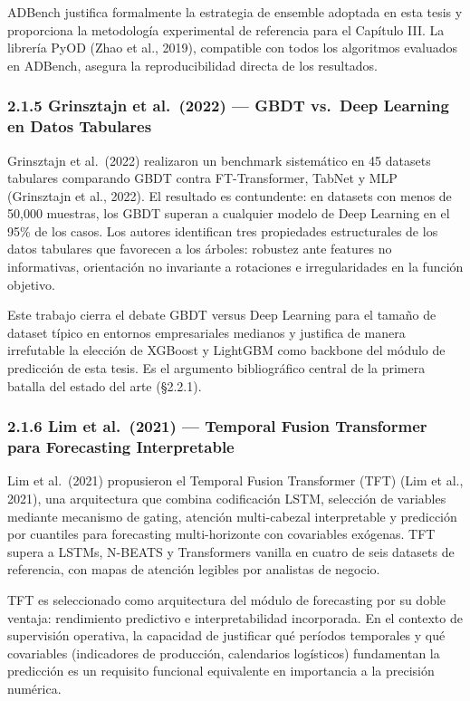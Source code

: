 ADBench justifica formalmente la estrategia de ensemble adoptada en esta
tesis y proporciona la metodología experimental de referencia para el
Capítulo III. La librería PyOD (Zhao et al., 2019), compatible con todos
los algoritmos evaluados en ADBench, asegura la reproducibilidad directa
de los resultados.

\subsubsection{2.1.5 Grinsztajn et al.~(2022) --- GBDT vs.~Deep Learning
en Datos
Tabulares}\label{grinsztajn-et-al.-2022-gbdt-vs.-deep-learning-en-datos-tabulares}

Grinsztajn et al.~(2022) realizaron un benchmark sistemático en 45
datasets tabulares comparando GBDT contra FT-Transformer, TabNet y MLP
(Grinsztajn et al., 2022). El resultado es contundente: en datasets con
menos de 50,000 muestras, los GBDT superan a cualquier modelo de Deep
Learning en el 95\% de los casos. Los autores identifican tres
propiedades estructurales de los datos tabulares que favorecen a los
árboles: robustez ante features no informativas, orientación no
invariante a rotaciones e irregularidades en la función objetivo.

Este trabajo cierra el debate GBDT versus Deep Learning para el tamaño
de dataset típico en entornos empresariales medianos y justifica de
manera irrefutable la elección de XGBoost y LightGBM como backbone del
módulo de predicción de esta tesis. Es el argumento bibliográfico
central de la primera batalla del estado del arte (§2.2.1).

\subsubsection{2.1.6 Lim et al.~(2021) --- Temporal Fusion Transformer
para Forecasting
Interpretable}\label{lim-et-al.-2021-temporal-fusion-transformer-para-forecasting-interpretable}

Lim et al.~(2021) propusieron el Temporal Fusion Transformer (TFT) (Lim
et al., 2021), una arquitectura que combina codificación LSTM, selección
de variables mediante mecanismo de gating, atención multi-cabezal
interpretable y predicción por cuantiles para forecasting
multi-horizonte con covariables exógenas. TFT supera a LSTMs, N-BEATS y
Transformers vanilla en cuatro de seis datasets de referencia, con mapas
de atención legibles por analistas de negocio.

TFT es seleccionado como arquitectura del módulo de forecasting por su
doble ventaja: rendimiento predictivo e interpretabilidad incorporada.
En el contexto de supervisión operativa, la capacidad de justificar qué
períodos temporales y qué covariables (indicadores de producción,
calendarios logísticos) fundamentan la predicción es un requisito
funcional equivalente en importancia a la precisión numérica.

